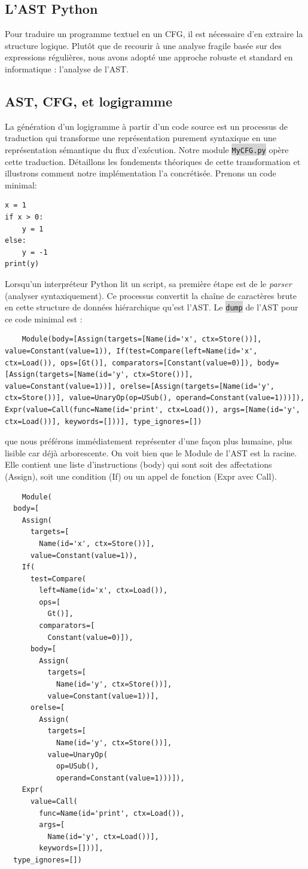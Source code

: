 \documentclass[11pt,a4paper]{article}
\newcommand{\code}[1]{\colorbox{lightgray}{\texttt{\small #1}}}
\begin{document}
\subsection{L'AST Python}
Pour traduire un programme textuel en un CFG, il est nécessaire d'en extraire la structure logique. Plutôt que de recourir à une analyse fragile basée sur des expressions régulières, nous avons adopté une approche robuste et standard en informatique : l'analyse de l'AST.

\subsection{AST, CFG, et logigramme}
La génération d'un logigramme à partir d'un code source est un processus de traduction qui transforme une représentation purement syntaxique en une représentation sémantique du flux d'exécution. Notre module \code{MyCFG.py} opère cette traduction. Détaillons les fondements théoriques de cette transformation et illustrons comment notre implémentation l'a concrétisée.
\hline
Prenons un code minimal:
\begin{verbatim}
x = 1
if x > 0:
    y = 1
else:
    y = -1
print(y)
\end{verbatim}
Lorsqu'un interpréteur Python lit un script, sa première étape est de le \textit{parser} (analyser syntaxiquement). Ce processus convertit la chaîne de caractères brute en cette structure de données hiérarchique qu'est l'AST. Le \code{dump} de l'AST pour ce code minimal est :
\begin{verbatim}
    Module(body=[Assign(targets=[Name(id='x', ctx=Store())], value=Constant(value=1)), If(test=Compare(left=Name(id='x', ctx=Load()), ops=[Gt()], comparators=[Constant(value=0)]), body=[Assign(targets=[Name(id='y', ctx=Store())], value=Constant(value=1))], orelse=[Assign(targets=[Name(id='y', ctx=Store())], value=UnaryOp(op=USub(), operand=Constant(value=1)))]), Expr(value=Call(func=Name(id='print', ctx=Load()), args=[Name(id='y', ctx=Load())], keywords=[]))], type_ignores=[])
\end{verbatim}
que nous préférons immédiatement représenter d'une façon plus humaine, plus lisible car déjà arborescente. On voit bien que le Module de l'AST est la racine. Elle contient une liste d'instructions (body) qui sont soit des affectations (Assign), soit une condition (If) ou un appel de fonction (Expr avec Call).
\begin{verbatim}
    Module(
  body=[
    Assign(
      targets=[
        Name(id='x', ctx=Store())],
      value=Constant(value=1)),
    If(
      test=Compare(
        left=Name(id='x', ctx=Load()),
        ops=[
          Gt()],
        comparators=[
          Constant(value=0)]),
      body=[
        Assign(
          targets=[
            Name(id='y', ctx=Store())],
          value=Constant(value=1))],
      orelse=[
        Assign(
          targets=[
            Name(id='y', ctx=Store())],
          value=UnaryOp(
            op=USub(),
            operand=Constant(value=1)))]),
    Expr(
      value=Call(
        func=Name(id='print', ctx=Load()),
        args=[
          Name(id='y', ctx=Load())],
        keywords=[]))],
  type_ignores=[])
\end{verbatim}
\end{document}
